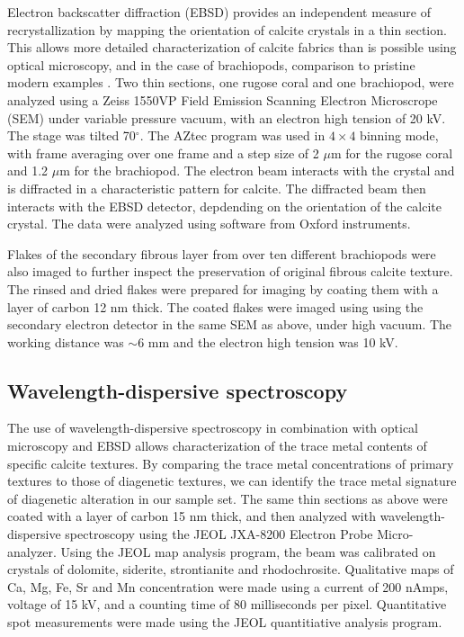 \documentclass{article}
\begin{document}
Electron backscatter diffraction (EBSD) provides an independent measure of recrystallization by mapping the orientation of calcite crystals in a thin section. This allows more detailed characterization of calcite fabrics than is possible using optical microscopy, and in the case of brachiopods, comparison to pristine modern examples \citep{PerezHuerta2007}. Two thin sections, one rugose coral and one brachiopod, were analyzed using a Zeiss 1550VP Field Emission Scanning Electron Microscrope (SEM) under variable pressure vacuum, with an electron high tension of 20 kV. The stage was tilted 70$^{\circ}$. The AZtec program was used in $4\times4$ binning mode, with frame averaging over one frame and a step size of 2 $\mu$m for the rugose coral and 1.2 $\mu$m for the brachiopod. The electron beam interacts with the crystal and is diffracted in a characteristic pattern for calcite. The diffracted beam then interacts with the EBSD detector, depdending on the orientation of the calcite crystal. The data were analyzed using software from Oxford instruments.

Flakes of the secondary fibrous layer from over ten different brachiopods were also imaged to further inspect the preservation of original fibrous calcite texture. The rinsed and dried flakes were prepared for imaging by coating them with a layer of carbon 12 nm thick. The coated flakes were imaged using using the secondary electron detector in the same SEM as above, under high vacuum. The working distance was $\sim 6$ mm and the electron high tension was 10 kV. 

\subsection{Wavelength-dispersive spectroscopy}

The use of wavelength-dispersive spectroscopy in combination with optical microscopy and EBSD allows characterization of the trace metal contents of specific calcite textures. By comparing the trace metal concentrations of primary textures to those of diagenetic textures, we can identify the trace metal signature of diagenetic alteration in our sample set. The same thin sections as above were coated with a layer of carbon 15 nm thick, and then analyzed with wavelength-dispersive spectroscopy using the JEOL JXA-8200 Electron Probe Micro-analyzer. Using the JEOL map analysis program, the beam was calibrated on crystals of dolomite, siderite, strontianite and rhodochrosite. Qualitative maps of Ca, Mg, Fe, Sr and Mn concentration were made using a current of 200 nAmps, voltage of 15 kV, and a counting time of 80 milliseconds per pixel. Quantitative spot measurements were made using the JEOL quantitiative analysis program. 
\end{document}
